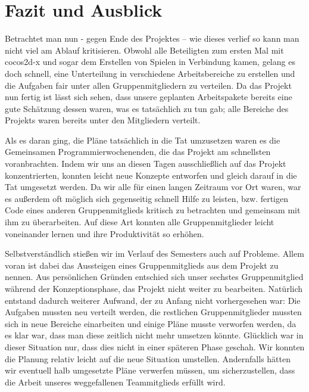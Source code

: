 \chapter{Fazit und Ausblick}\label{ch:fazit}


\label{sec:6_review}

Betrachtet man nun - gegen Ende des Projektes – wie dieses verlief so kann man nicht viel am Ablauf kritisieren. Obwohl alle Beteiligten zum ersten Mal mit cocos2d-x und sogar dem Erstellen von Spielen in Verbindung kamen, gelang es doch schnell, eine Unterteilung in verschiedene Arbeitsbereiche zu erstellen und die Aufgaben fair unter allen Gruppenmitgliedern zu verteilen. Da das Projekt nun fertig ist lässt sich sehen, dass unsere geplanten Arbeitspakete bereits eine gute Schätzung dessen waren, was es tatsächlich zu tun gab; alle Bereiche des Projekts waren bereits unter den Mitgliedern verteilt.

Als es daran ging, die Pläne tatsächlich in die Tat umzusetzen waren es die Gemeinsamen Programmierwochenenden, die das Projekt am schnellsten voranbrachten. Indem wir uns an diesen Tagen ausschließlich auf das Projekt konzentrierten, konnten leicht neue Konzepte entworfen und gleich darauf in die Tat umgesetzt werden. Da wir alle für einen langen Zeitraum vor Ort waren, war es außerdem oft möglich sich gegenseitig schnell Hilfe zu leisten, bzw. fertigen Code eines anderen Gruppenmitglieds kritisch zu betrachten und gemeinsam mit ihm zu überarbeiten. Auf diese Art konnten alle Gruppenmitglieder leicht voneinander lernen und ihre Produktivität so erhöhen.

Selbstverständlich stießen wir im Verlauf des Semesters auch auf Probleme. Allem voran ist dabei das Aussteigen eines Gruppenmitglieds aus dem Projekt zu nennen. Aus persönlichen Gründen entschied sich unser sechstes Gruppenmitglied während der Konzeptionsphase, das Projekt nicht weiter zu bearbeiten. Natürlich entstand dadurch weiterer Aufwand, der  zu Anfang nicht vorhergesehen war: Die Aufgaben mussten neu verteilt werden, die restlichen Gruppenmitglieder mussten sich in neue Bereiche einarbeiten und einige Pläne musste verworfen werden, da es klar war, dass man diese zeitlich nicht mehr umsetzen könnte. Glücklich war in dieser Situation nur, dass dies nicht in einer späteren Phase geschah. Wir konnten die Planung relativ leicht auf die neue Situation umstellen. Andernfalls hätten wir eventuell halb umgesetzte Pläne verwerfen müssen, um sicherzustellen, dass die Arbeit unseres weggefallenen Teammitglieds erfüllt wird.

